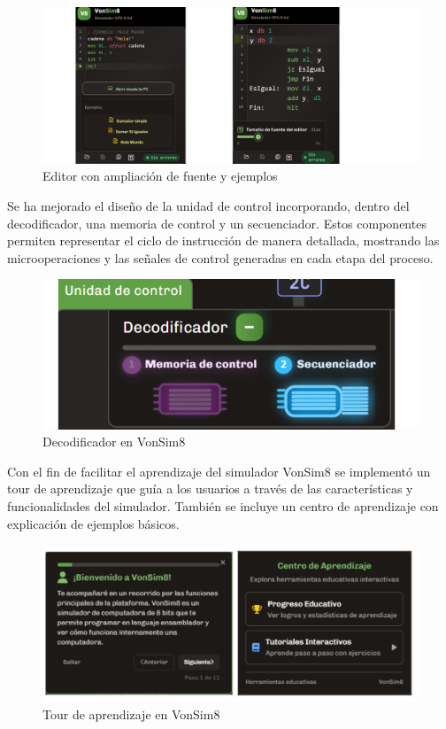 \documentclass[12pt,oneside]{templates/unerthesis}
\begin{document}
\begin{figure}

{\centering \includegraphics[width=0.85\linewidth]{images/editorfuenteejemplo} 

}

\caption{Editor con ampliación de fuente y ejemplos}\label{fig:editorvonsim}
\end{figure}

Se ha mejorado el diseño de la unidad de control incorporando, dentro del decodificador, una memoria de control y un secuenciador. Estos componentes permiten representar el ciclo de instrucción de manera detallada, mostrando las microoperaciones y las señales de control generadas en cada etapa del proceso.

\begin{figure}

{\centering \includegraphics[width=0.85\linewidth]{images/decodificador} 

}

\caption{Decodificador en VonSim8}\label{fig:decodificador}
\end{figure}

Con el fin de facilitar el aprendizaje del simulador VonSim8 se implementó un tour de aprendizaje que guía a los usuarios a través de las características y funcionalidades del simulador. También se incluye un centro de aprendizaje con explicación de ejemplos básicos.

\begin{figure}

{\centering \includegraphics[width=0.85\linewidth]{images/tour} 

}

\caption{Tour de aprendizaje en VonSim8}\label{fig:tour}
\end{figure}
\end{document}
